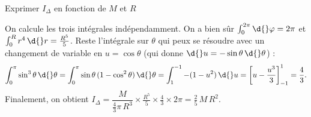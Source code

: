 \debutEntrainement


\begin{enonce}
	Exprimer $I_\Delta$ en fonction de $M$ et $R$
\end{enonce}



\begin{corrigeNewpage}
On calcule les trois intégrales indépendamment. 
On a bien sûr $\int_{0}^{2\pi} \d{}\varphi=2\pi$ et 
$\int_{0}^{R} r^4\,\d{}r = \frac{R^5}{5}$. 
Reste l'intégrale sur $\theta$ qui peux se résoudre avec un changement de
variable en $u = \cos\theta$ (qui donne $\d{}u = -\sin\theta\,\d{}\theta$) : 
\[
\int_0^\pi \sin^3\theta\,\d{}\theta 
	= \int_0^\pi \sin\theta\,(1 - \cos^2\theta)\,\d{}\theta
	= \int_1^{-1} - (1 - u^2)\,\d{}u
	= \left[u - \frac{u^3}{3}\right]_{-1}^{1}
	= \frac{4}{3}.
\]
Finalement, on obtient 
$I_\Delta = \dfrac{M}{\frac{4}{3}\pi\,R^3} 
	\times \frac{R^5}{5} \times \frac{4}{3}
	\times 2\pi 
	= \frac{2}{5}\,M\,R^2$.
\end{corrigeNewpage}
	

\finEntrainement



\newpage





\hauteurLargeurCadreReponse		{8mm}{2cm}
\typeEntrainement				{} %
\initialisationEntrainement

